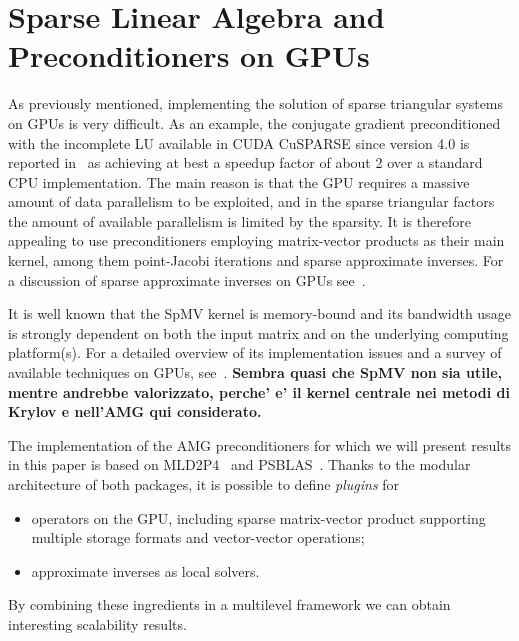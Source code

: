 \section{Sparse Linear Algebra and Preconditioners on GPUs\label{SLA-GPU}}


As previously mentioned, implementing the
solution of sparse triangular systems on GPUs is very difficult.
As an example, the conjugate gradient preconditioned with the incomplete
LU available in CUDA CuSPARSE since version 4.0 
is reported in~\cite{Naumov11} as achieving at best a speedup factor
of about 2 over a standard CPU implementation. The main reason is that
the GPU requires a massive amount of data parallelism to be exploited,
and in the sparse triangular factors the amount of available
parallelism is limited by the sparsity. It is therefore appealing to
use preconditioners employing matrix-vector products as their main
kernel, among them point-Jacobi iterations and sparse approximate inverses.
For a discussion of sparse approximate inverses on GPUs 
see~\cite{BERTACCINI2016693}. 

It is well known that the SpMV kernel is memory-bound
and  its bandwidth usage  is strongly dependent on both the input
matrix and on the underlying computing platform(s). For a detailed
overview of its implementation issues and a survey of available
techniques on GPUs, see~\cite{Filippone:2017:SMM:3034774.3017994}.
\textbf{Sembra quasi che SpMV non sia utile, mentre andrebbe valorizzato, perche' e'
il kernel centrale nei metodi di Krylov e nell'AMG qui considerato.}

The implementation of the AMG preconditioners for which we will
present results in this paper is based on MLD2P4~\cite{mld-toms} and
PSBLAS~\cite{psblas3}. Thanks to the modular architecture of both
packages, it is possible to define \emph{plugins} for 
\begin{itemize}
\item operators on the GPU, including sparse matrix-vector product
  supporting multiple storage formats and vector-vector operations;
\item approximate inverses as local solvers.
\end{itemize}
By combining these ingredients in a multilevel framework we can obtain
interesting scalability results. 

